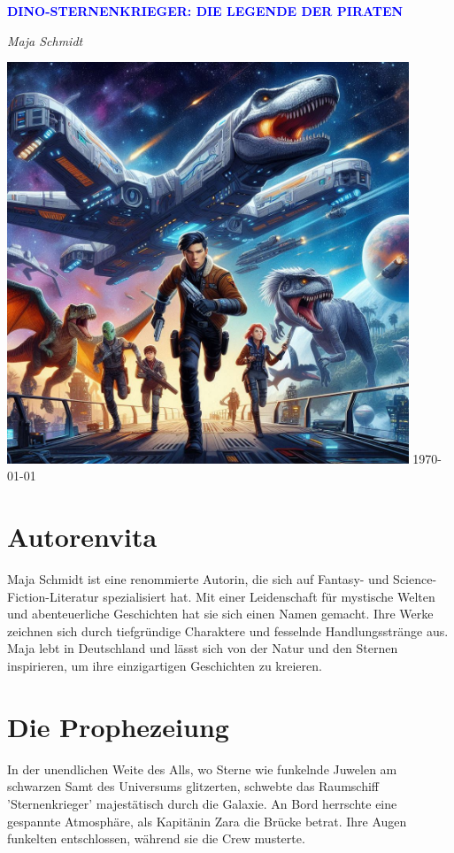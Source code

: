 \documentclass[12pt]{article}
\begin{document}
\begin{titlepage}
    \centering
    \vspace*{3cm}
    {\Huge\bfseries\textcolor{blue}{\MakeUppercase{ Dino-Sternenkrieger: Die Legende der Piraten }}\par}
    \vspace{0.5cm}
    {\Large\textit{ Maja Schmidt }\par}
    \vfill
    \includegraphics[width=0.9\textwidth]{ cover.jpg }
    \vfill
    \today
\end{titlepage}

\section*{Autorenvita}
\vspace{4cm}
Maja Schmidt ist eine renommierte Autorin, die sich auf Fantasy- und Science-Fiction-Literatur spezialisiert hat. Mit einer Leidenschaft für mystische Welten und abenteuerliche Geschichten hat sie sich einen Namen gemacht. Ihre Werke zeichnen sich durch tiefgründige Charaktere und fesselnde Handlungsstränge aus. Maja lebt in Deutschland und lässt sich von der Natur und den Sternen inspirieren, um ihre einzigartigen Geschichten zu kreieren.

\clearpage
\tableofcontents
\clearpage


\section{ Die Prophezeiung }
 In der unendlichen Weite des Alls, wo Sterne wie funkelnde Juwelen am schwarzen Samt des Universums glitzerten, schwebte das Raumschiff 'Sternenkrieger' majestätisch durch die Galaxie. An Bord herrschte eine gespannte Atmosphäre, als Kapitänin Zara die Brücke betrat. Ihre Augen funkelten entschlossen, während sie die Crew musterte.
\end{document}
